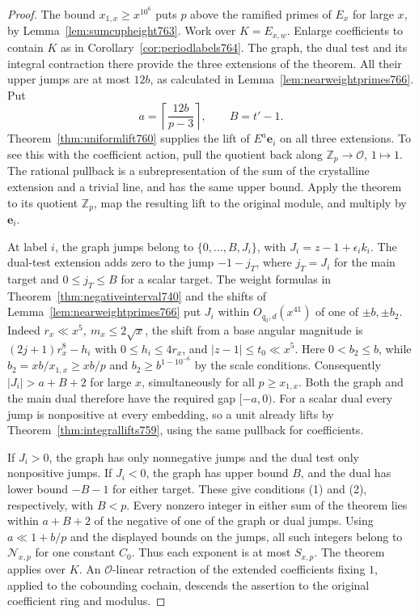 \documentclass[a4paper,11pt]{article}
\theoremstyle{definition}
\theoremstyle{remark}
\newcommand{\ZZ}{\mathbb Z}\newcommand{\ord}{\operatorname{ord}}
\numberwithin{equation}{section}
\begin{document}
\begin{proof}
The bound \(x_{1,x}\ge x^{10^6}\) puts \(p\) above the
ramified primes of \(E_x\) for large \(x\), by
Lemma~\ref{lem:sumcupheight763}. Work over \(K=E_{x,w}\).
Enlarge coefficients to contain \(K\) as in
Corollary~\ref{cor:periodlabels764}. The graph, the dual
test and its integral contraction there provide the three
extensions of the theorem. All their upper jumps are at
most \(12b\), as calculated in
Lemma~\ref{lem:nearweightprimes766}. Put
\[
       a=\left\lceil \frac{12b}{p-3}\right\rceil,\qquad
       B=t'-1 .
\]
Theorem~\ref{thm:uniformlift760} supplies the lift of
\(E^a\mathbf e_i\) on all three extensions. To see this
with the coefficient action, pull the quotient back along
\(\ZZ_p\to\mathcal O\), \(1\mapsto1\). The rational
pullback is a subrepresentation of the sum of the
crystalline extension and a trivial line, and has the
same upper bound. Apply the theorem to its quotient
\(\ZZ_p\), map the resulting lift to the original module,
and multiply by \(\mathbf e_i\).

At label \(i\), the graph jumps belong to
\(\{0,\ldots,B,J_i\}\), with \(J_i=z-1+\epsilon_i k_i\).
The dual-test extension adds zero to the jump \(-1-j_T\),
where \(j_T=J_i\) for the main target and \(0\le j_T\le B\)
for a scalar target. The weight formulas in
Theorem~\ref{thm:negativeinterval740} and the shifts of
Lemma~\ref{lem:nearweightprimes766} put \(J_i\) within
\(O_{q_0,d}(x^{41})\) of one of \(\pm b,\pm b_2\).
Indeed \(r_x\ll x^5,\ m_x\le2\sqrt{x}\), the shift from
a base angular magnitude is \((2j+1)r_x^8-h_i\) with
\(0\le h_i\le4r_x\), and \(|z-1|\le t_0\ll x^5\).
Here \(0<b_2\le b\), while
\(b_2=xb/x_{1,x}\ge x b/p\) and
\(b_2\ge b^{1-10^{-6}}\) by the scale conditions.
Consequently \(|J_i|>a+B+2\) for large \(x\), simultaneously
for all \(p\ge x_{1,x}\). Both the graph and the main
dual therefore have the required gap \([-a,0)\). For a
scalar dual every jump is nonpositive at every embedding,
so a unit already lifts by Theorem~\ref{thm:integrallifts759},
using the same pullback for coefficients.

If \(J_i>0\), the graph has only nonnegative jumps and the
dual test only nonpositive jumps. If \(J_i<0\), the graph
has upper bound \(B\), and the dual has lower bound
\(-B-1\) for either target. These give conditions (1) and
(2), respectively, with \(B<p\). Every nonzero integer in
either sum of the theorem lies within \(a+B+2\) of the
negative of one of the graph or dual jumps. Using
\(a\ll 1+b/p\) and the displayed bounds on the jumps,
all such integers belong to \(\mathcal N_{x,p}\) for one
constant \(C_0\). Thus each exponent is at most \(S_{x,p}\).
The theorem applies over \(K\). An \(\mathcal O\)-linear
retraction of the extended coefficients fixing \(1\),
applied to the cobounding cochain, descends the assertion
to the original coefficient ring and modulus.
\end{proof}
\clearpage
\end{document}
